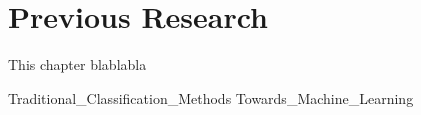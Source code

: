 \chapter{Previous Research} \label{ch:pr}

This chapter blablabla

{Traditional_Classification_Methods}
{Towards_Machine_Learning}